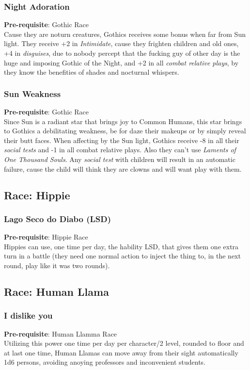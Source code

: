 \documentclass[ letterpaper,12pt]{article}
\begin{document}
\subsubsection{Night Adoration}
{\bf Pre-requisite}: Gothic Race\\
Cause they are noturn creatures, Gothics receives some bonus when far from Sun light.  They receive +2 in {\it Intimidate}, cause they frighten children and old ones, +4 in {\it disguises}, due to nobody percept that the fucking guy of other day is the huge and imposing Gothic of the Night, and +2 in all {\it combat relative plays}, by they know the benefities of shades and nocturnal whispers.\\

\subsubsection{Sun Weakness}
 {\bf Pre-requisite}: Gothic Race\\
 Since Sun is a radiant star that brings joy to Common Humans, this star brings to Gothics a debilitating weakness, be for daze their makeups or by simply reveal their butt faces. When affecting by the Sun light, Gothics receive -8 in all their {\it social tests} and -1 in all {combat relative plays}. Also they can't use {\it Laments of One Thousand Souls}. Any {\it social test} with children will result in an automatic failure, cause the child will think they are clowns and will want play with them.

\subsection{Race: Hippie}

\subsubsection{Lago Seco do Diabo (LSD)}
{\bf Pre-requisite}: Hippie Race\\
Hippies can use, one time per day, the hability LSD, that gives them one extra turn in a battle (they need one normal action to inject the thing to, in the next round, play like it was two rounds).

\subsection{Race: Human Llama}

\subsubsection{I dislike you}
 {\bf Pre-requisite}: Human Llamma Race\\
Utilizing this power one time per day per character/2 level, rounded to floor and at last one time, Human Llamas can move away from their sight automatically 1d6 persons, avoiding anoying professors and inconvenient students.
\end{document}
